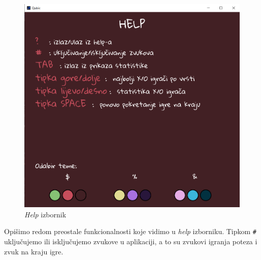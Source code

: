 \documentclass[12pt]{scrartcl}
\begin{document}
\begin{figure}[h]
	\centering
	\includegraphics[scale=0.5]{help.png}
	\caption{\emph{Help} izbornik}
	\label{fig:help}
\end{figure}

Opišimo redom preostale funkcionalnosti koje vidimo u \emph{help} izborniku. Tipkom \texttt{\#} uključujemo ili isključujemo zvukove u aplikaciji, a to su zvukovi igranja poteza i zvuk na kraju igre. 
\end{document}
